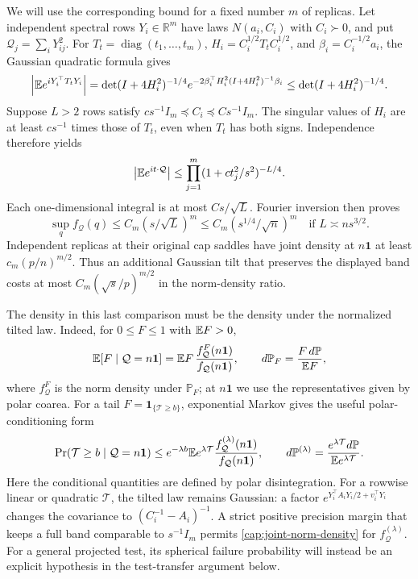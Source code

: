 We will use the corresponding bound for a fixed number \(m\) of replicas.
Let independent spectral rows \(Y_i\in\mathbb R^m\) have laws
\(N(a_i,C_i)\) with \(C_i\succ0\), and put
\(\mathcal Q_j=\sum_iY_{ij}^2\). For \(T_t=\operatorname{diag}(t_1,\ldots,t_m)\),
\(H_i=C_i^{1/2}T_tC_i^{1/2}\), and \(\beta_i=C_i^{-1/2}a_i\), the Gaussian
quadratic formula gives
\[
 \left|\mathbb E e^{iY_i^\top T_tY_i}\right|
 =\det(I+4H_i^2)^{-1/4}
   e^{-2\beta_i^\top H_i^2(I+4H_i^2)^{-1}\beta_i}
 \le \det(I+4H_i^2)^{-1/4}.
\]
Suppose \(L>2\) rows satisfy \(c s^{-1}I_m\preceq C_i\preceq C s^{-1}I_m\).
The singular values of \(H_i\) are at least \(c s^{-1}\) times those of
\(T_t\), even when \(T_t\) has both signs. Independence therefore yields
\[
 \left|\mathbb E e^{it\cdot\mathcal Q}\right|
 \le\prod_{j=1}^m(1+c t_j^2/s^2)^{-L/4}.
\]
Each one-dimensional integral is at most \(Cs/\sqrt L\). Fourier inversion
then proves
\begin{equation}\label{cap:joint-norm-density}
 \sup_q f_{\mathcal Q}(q)\le C_m(s/\sqrt L)^m
 \le C_m(s^{1/4}/\sqrt n)^m
 \quad\text{if }L\asymp ns^{3/2}.
\end{equation}
Independent replicas at their original cap saddles have joint density at
\(n\mathbf1\) at least \(c_m(p/n)^{m/2}\). Thus an additional Gaussian
tilt that preserves the displayed band costs at most
\(C_m(\sqrt s/p)^{m/2}\) in the norm-density ratio.

The density in this last comparison must be the density under the
normalized tilted law. Indeed, for \(0\le F\le1\) with \(\mathbb E F>0\),
\[
 \mathbb E[F\mid\mathcal Q=n\mathbf1]
 =\mathbb E F\,\frac{f_{\mathcal Q}^{F}(n\mathbf1)}
                  {f_{\mathcal Q}(n\mathbf1)},
 \qquad d\mathbb P_F=\frac{F\,d\mathbb P}{\mathbb E F},
\]
where \(f_{\mathcal Q}^{F}\) is the norm density under \(\mathbb P_F\);
at \(n\mathbf1\) we use the representatives given by polar coarea.
For a tail \(F=\mathbf1_{\{\mathcal T\ge b\}}\), exponential Markov gives
the useful polar-conditioning form
\begin{equation}\label{cap:conditioned-tail}
 \Pr(\mathcal T\ge b\mid\mathcal Q=n\mathbf1)
 \le e^{-\lambda b}\mathbb E e^{\lambda\mathcal T}
       \frac{f_{\mathcal Q}^{(\lambda)}(n\mathbf1)}
            {f_{\mathcal Q}(n\mathbf1)},\qquad
 d\mathbb P^{(\lambda)}
 =\frac{e^{\lambda\mathcal T}d\mathbb P}{\mathbb E e^{\lambda\mathcal T}} .
\end{equation}
Here the conditional quantities are defined by polar disintegration.
For a rowwise linear or quadratic \(\mathcal T\), the tilted law remains
Gaussian: a factor \(e^{Y_i^\top A_iY_i/2+v_i^\top Y_i}\) changes the
covariance to \((C_i^{-1}-A_i)^{-1}\). A strict positive precision margin
that keeps a full band comparable to \(s^{-1}I_m\) permits
\eqref{cap:joint-norm-density} for \(f_{\mathcal Q}^{(\lambda)}\).
For a general projected test, its spherical failure probability will instead
be an explicit hypothesis in the test-transfer argument below.

